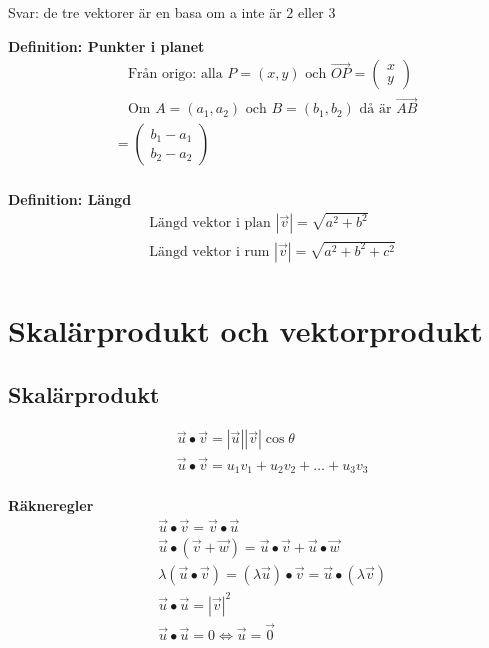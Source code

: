 \begin{multicols}{2}
Svar: de tre vektorer är en basa om a inte är $2$ eller $3$


\textbf{Definition: Punkter i planet}
\begin{align*}
  &\quad  \text{Från origo: alla } P=(x,y) \text{ och }
  \overrightarrow{OP} = \begin{pmatrix}  x \\  y   \end{pmatrix} \\
  &\quad  \text{Om } A=(a_1,a_2) \text{ och } B=(b_1,b_2) \text{ då är } \overrightarrow{AB} \\
  &= \begin{pmatrix}  b_1-a_1 \\  b_2-a_2   \end{pmatrix} \\
\end{align*}


\textbf{Definition: Längd}
\begin{align*}
  &\quad  \text{Längd vektor i plan } |\vec{v}| = \sqrt{a^2+b^2} \\
  &\quad  \text{Längd vektor i rum } |\vec{v}| = \sqrt{a^2+b^2+c^2} \\
\end{align*}


\section{Skalärprodukt och vektorprodukt}
\subsection{Skalärprodukt}
\begin{align*}
  &\quad  \vec{u}\bullet\vec{v} = |\vec{u}||\vec{v}|\cos{\theta} \\
  &\quad  \vec{u}\bullet\vec{v} = u_1v_1+u_2v_2+ \ldots +u_3v_3 \\
\end{align*}

\textbf{Räkneregler}
\begin{align*}
  &\quad  \vec{u}\bullet\vec{v} = \vec{v}\bullet\vec{u} \\
  &\quad  \vec{u}\bullet(\vec{v}+\vec{w}) = \vec{u}\bullet\vec{v} + \vec{u}\bullet\vec{w} \\
  &\quad  \lambda(\vec{u}\bullet\vec{v}) = (\lambda\vec{u})\bullet\vec{v} =
  \vec{u}\bullet(\lambda\vec{v}) \\
  &\quad  \vec{u}\bullet\vec{u} = |\vec{v}|^2 \\
  &\quad  \vec{u}\bullet\vec{u} = 0 \Leftrightarrow \vec{u} = \vec{0} \\
\end{align*}


\end{multicols}
